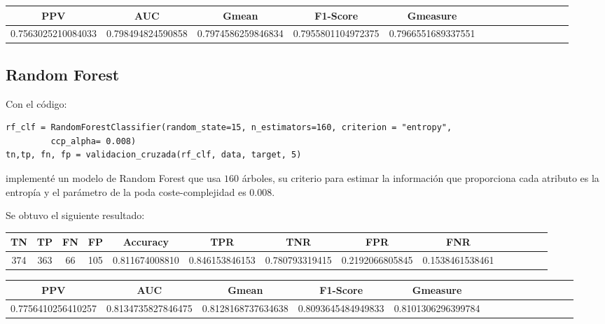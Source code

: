 \documentclass[a4]{article}
\begin{document}
\begin{center}
\begin{tabular}{|c|c|c|c|c|c|c|c|c|c|c|c|c|c|}
\hline
\multicolumn{1}{|c|}{\textbf{PPV}} & \textbf{AUC} & \textbf{Gmean} & \textbf{F1-Score} & \textbf{Gmeasure}  \\ \hline
  0.7563025210084033 & 0.798494824590858 & 0.7974586259846834 & 0.7955801104972375 & 0.7966551689337551 \\ \hline
\end{tabular}
\end{center}

\subsection{Random Forest}

Con el código:

\begin{lstlisting}
rf_clf = RandomForestClassifier(random_state=15, n_estimators=160, criterion = "entropy",
         ccp_alpha= 0.008)
tn,tp, fn, fp = validacion_cruzada(rf_clf, data, target, 5)
\end{lstlisting}

implementé un modelo de Random Forest que usa $160$ árboles, su criterio para estimar la información que proporciona cada atributo es la entropía y el parámetro de la poda coste-complejidad es $0.008$.

Se obtuvo el siguiente resultado:

\begin{center}
\begin{tabular}{|c|c|c|c|c|c|c|c|c|c|c|c|c|c|}
\hline
\multicolumn{1}{|c|}{\textbf{TN}}& \textbf{TP} & \textbf{FN} & \textbf{FP} & \textbf{Accuracy} & \textbf{TPR} & \textbf{TNR} & \textbf{FPR} &\textbf{FNR} \\ \hline
  374 & 363 & 66 & 105 & 0.811674008810 & 0.846153846153 & 0.780793319415 & 0.2192066805845 & 0.1538461538461 \\ \hline
\end{tabular}
\end{center}

\begin{center}
\begin{tabular}{|c|c|c|c|c|c|c|c|c|c|c|c|c|c|}
\hline
\multicolumn{1}{|c|}{\textbf{PPV}} & \textbf{AUC} & \textbf{Gmean} & \textbf{F1-Score} & \textbf{Gmeasure}  \\ \hline
  0.7756410256410257 & 0.8134735827846475 & 0.8128168737634638 & 0.8093645484949833 & 0.8101306296399784
 \\ \hline
\end{tabular}
\end{center}
\end{document}
